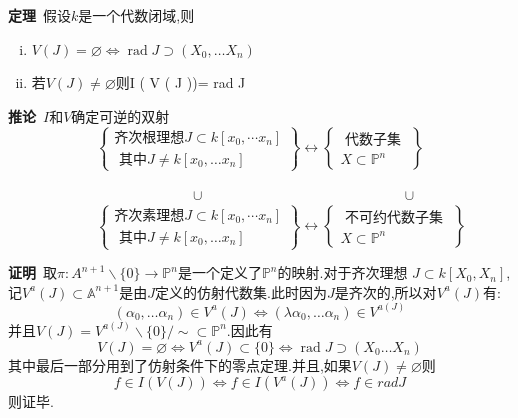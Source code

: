 \documentclass[UTF8]{book}
\begin{document}
		
		\textbf{定理}\ 假设$ k $是一个代数闭域,则
		\begin{enumerate}[(i)]
			\item $ V ( J )=\varnothing  \Longleftrightarrow \operatorname{rad} J \supset\left( X _{0}, \ldots X _{ n }\right)$
			\item 若$V ( J ) \neq \varnothing$则$ $I ( V ( J ))= rad J$ $
		\end{enumerate}
		
		
		\textbf{推论}\ $ I $和$ V $确定可逆的双射
		\begin{equation*}
		\left\{\begin{array}{l}
		{\text {齐次根理想} J \subset k [x_{0}, \cdots x_{n} ]} \\
		{\text { 其中} J \neq k [x_{0}, \ldots x_{n} ]} 
		\end{array}\right\}
		 \longleftrightarrow
		 \left\{\begin{array}{c}
		{\text { 代数子集 }} \\
		{X \subset \mathbb{P} ^{n}}
		\end{array}\right\}
		\end{equation*}
		
		$\qquad \quad \qquad\qquad \qquad \qquad \qquad \cup \qquad \qquad \qquad\qquad \qquad \qquad \qquad \cup $
		\begin{equation*}
		\qquad\quad
		\left\{\begin{array}{l}
		{\text {齐次素理想} J \subset k [x_{0}, \cdots x_{n} ]} \\
		{\text { 其中} J \neq k [x_{0}, \ldots x_{n} ]} 
		\end{array}\right\}
		\longleftrightarrow
		\left\{\begin{array}{c}
		{\text { 不可约代数子集 }} \\
		{X \subset \mathbb{P} ^{n}}
		\end{array}\right\}
		\end{equation*}
		
		
		\textbf{证明}\ 取$\pi: A ^{n+1} \backslash\{0\} \rightarrow \mathbb{P}^{n}$是一个定义了$\mathbb{P} ^{n}$的映射.对于齐次理想 $J \subset k \left[ X _{0}, X _{ n }\right]$,记$V ^{ a }( J ) \subset \mathbb{A} ^{ n +1}$是由$ J $定义的仿射代数集.此时因为$ J $是齐次的,所以对$V ^{ a }( J )$有:
		\begin{equation*}
		\left(\alpha_{0}, \dots \alpha_{n}\right) \in V ^{ a }( J ) \Longleftrightarrow\left(\lambda \alpha_{0}, \dots \alpha_{n}\right) \in V ^{ a ( J )}
		\end{equation*}
		并且$V ( J )= V ^{ a ( J )} \backslash\{0\} / \sim \subset \mathbb{P} ^{ n } .$因此有
		\begin{equation*}
		V ( J )=\varnothing \Longleftrightarrow V ^{ a }( J ) \subset\{0\} \Longleftrightarrow \operatorname{rad} J \supset\left( X _{0} \ldots X _{ n }\right)
		\end{equation*}
		其中最后一部分用到了仿射条件下的零点定理.并且,如果$V ( J ) \neq \varnothing$则
		\begin{equation*}
		f \in I ( V ( J )) \Longleftrightarrow f \in I \left( V ^{ a }( J )\right) \Longleftrightarrow f \in rad J 
		\end{equation*}
		则证毕.
		
\end{document}
